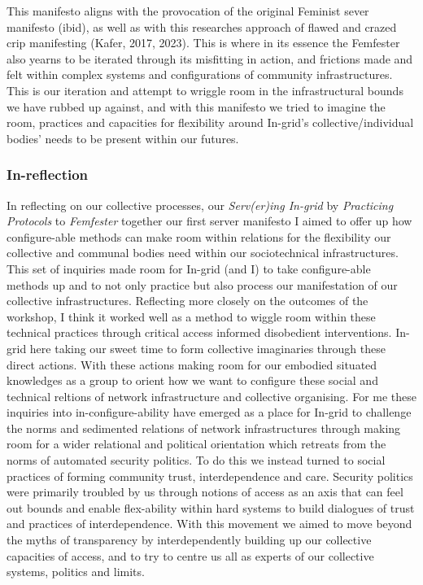 This manifesto aligns with the provocation of the original Feminist
sever manifesto (ibid), as well as with this researches approach of
flawed and crazed crip manifesting (Kafer, 2017, 2023). This is where in
its essence the Femfester also yearns to be iterated through its
misfitting in action, and frictions made and felt within complex systems
and configurations of community infrastructures. This is our iteration
and attempt to wriggle room in the infrastructural bounds we have rubbed
up against, and with this manifesto we tried to imagine the room,
practices and capacities for flexibility around In-grid's
collective/individual bodies' needs to be present within our futures.

\hypertarget{in-reflection}{%
\subsubsection[In-reflection]{\texorpdfstring{\protect\hypertarget{anchor}{}{}In-reflection}{In-reflection}}\label{in-reflection}}

In reflecting on our collective processes, our \emph{Serv(er)ing
In-grid} by \emph{Practicing Protocols} to \emph{Femfester} together our
first server manifesto I aimed to offer up how configure-able methods
can make room within relations for the flexibility our collective and
communal bodies need within our sociotechnical infrastructures. This set
of inquiries made room for In-grid (and I) to take configure-able
methods up and to not only practice but also process our manifestation
of our collective infrastructures. Reflecting more closely on the
outcomes of the workshop, I think it worked well as a method to wiggle
room within these technical practices through critical access informed
disobedient interventions. In-grid here taking our sweet time to form
collective imaginaries through these direct actions. With these actions
making room for our embodied situated knowledges as a group to orient
how we want to configure these social and technical reltions of network
infrastructure and collective organising. For me these inquiries into
in-configure-ability have emerged as a place for In-grid to challenge
the norms and sedimented relations of network infrastructures through
making room for a wider relational and political orientation which
retreats from the norms of automated security politics. To do this we
instead turned to social practices of forming community trust,
interdependence and care. Security politics were primarily troubled by
us through notions of access as an axis that can feel out bounds and
enable flex-ability within hard systems to build dialogues of trust and
practices of interdependence. With this movement we aimed to move beyond
the myths of transparency by interdependently building up our collective
capacities of access, and to try to centre us all as experts of our
collective systems, politics and limits.

